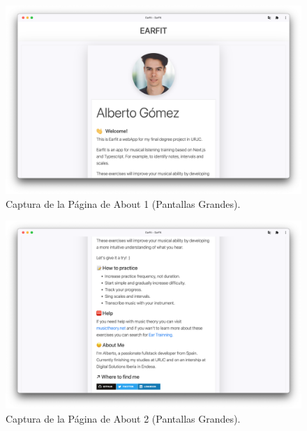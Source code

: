 \documentclass[12pt,twoside,titlepage]{report}
\begin{document}
\begin{figure}[H]
    \centering
    \includegraphics[scale=0.28]{Capturas Earfit/PC/About1}
    \caption{Captura de la Página de About 1 (Pantallas Grandes).}
    \label{fig:PCAbout1}
\end{figure}

\begin{figure}[H]
    \centering
    \includegraphics[scale=0.28]{Capturas Earfit/PC/About2}
    \caption{Captura de la Página de About 2 (Pantallas Grandes).}
    \label{fig:PCAbout2}
\end{figure}
\end{document}

